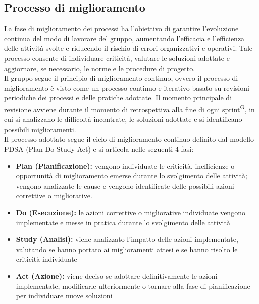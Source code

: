 \documentclass[a4paper, 11pt]{article}
\begin{document}
\subsection{Processo di miglioramento}
La fase di miglioramento dei processi ha l'obiettivo di garantire l'evoluzione continua del modo di lavorare del gruppo, aumentando l'efficacia e l'efficienza delle attività svolte e riducendo il rischio di errori organizzativi e operativi. 
Tale processo consente di individuare criticità, valutare le soluzioni adottate e aggiornare, se necessario, le norme e le procedure di progetto.\\
Il gruppo segue il principio di miglioramento continuo, ovvero il processo di miglioramento è visto come un processo continuo e iterativo basato su revisioni periodiche dei processi e delle pratiche adottate.
Il momento principale di revisione avviene durante il momento di retrospettiva alla fine di ogni sprint\textsuperscript{G}, in cui si analizzano le difficoltà incontrate, le soluzioni adottate e si identificano possibili miglioramenti.\\
Il processo adottato segue il ciclo di miglioramento continuo definito dal modello PDSA (Plan-Do-Study-Act) e si articola nelle seguenti 4 fasi:
\begin{itemize}
    \item \textbf{Plan (Pianificazione):} vengono individuate le criticità, inefficienze o opportunità di miglioramento emerse durante lo svolgimento delle attività; vengono analizzate le cause e vengono identificate delle possibili azioni correttive o migliorative.
    \item \textbf{Do (Esecuzione):} le azioni correttive o migliorative individuate vengono implementate e messe in pratica durante lo svolgimento delle attività
    \item \textbf{Study (Analisi):} viene analizzato l'impatto delle azioni implementate, valutando se hanno portato ai miglioramenti attesi e se hanno risolto le criticità individuate
    \item \textbf{Act (Azione):} viene deciso se adottare definitivamente le azioni implementate, modificarle ulteriormente o tornare alla fase di pianificazione per individuare nuove soluzioni
\end{itemize} 
\end{document}
